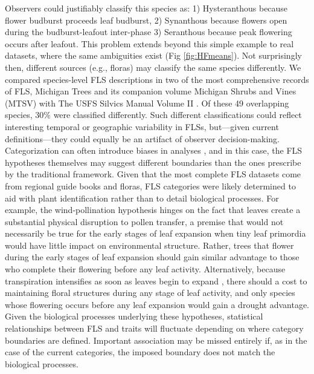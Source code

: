 \documentclass{article}
\begin{document}
\noindent Observers could justifiably classify this species as: 1) Hysteranthous because flower budburst proceeds leaf budburst, 2) Synanthous because flowers open during the budburst-leafout inter-phase 3) Seranthous because peak flowering occurs after leafout. This problem extends beyond this simple example to real datasets, \citep[e.g.][]{OKeefe2015} where the same ambiguities exist (Fig \ref{fig:HFmeans}). Not surprisingly then, different sources (e.g., floras) may classify the same species differently. We compared species-level FLS descriptions in two of the most comprehensive records of FLS, Michigan Trees and its companion volume Michigan Shrubs and Vines (MTSV) \citep{Barnes2004,Barnes2016} with The USFS Silvics Manual Volume II \citep{Burns1990}. Of these 49 overlapping species, 30\% were classified differently. Such different classifications could reflect interesting temporal or geographic variability in FLSs, but---given current definitions---they could equally be an artifact of observer decision-making.\\

\noindent Categorization can often introduce biases in analyses \citep{Naggara2011,Royston2006}, and in this case, the FLS hypotheses themselves may suggest different boundaries than the ones prescribe by the traditional framework. Given that the most complete FLS datasets come from regional guide books and floras, FLS categories were likely determined to aid with plant identification rather than to detail biological processes. For example, the wind-pollination hypothesis hinges on the fact that leaves create a substantial physical disruption to pollen transfer, a premise that would not necessarily be true for the early stages of leaf expansion when tiny leaf primordia would have little impact on environmental structure. Rather, trees that flower during the early stages of leaf expansion should gain similar advantage to those who complete their flowering before any leaf activity. Alternatively, because transpiration intensifies as soon as leaves begin to expand \citep{Breda1996,Wang2018}, there should a cost to maintaining floral structures during any stage of leaf activity, and only species whose flowering occurs before any leaf expansion would gain a drought advantage. Given the biological processes underlying these hypotheses, statistical relationships between FLS and traits will fluctuate depending on where category boundaries are defined. Important association may be missed entirely if, as in the case of the current categories, the imposed boundary does not match the biological processes.
\end{document}
